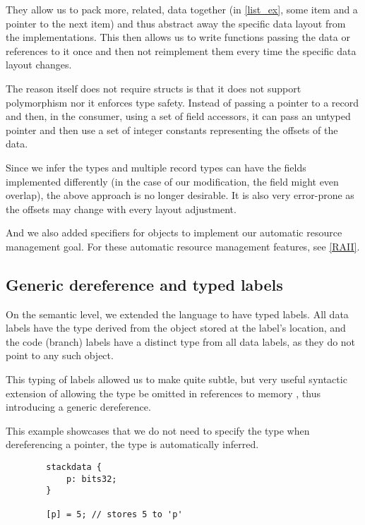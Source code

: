 They allow us to pack more, related, data together (in \cref{list_ex}, some item and a pointer to the next item) and thus abstract away the specific data layout from the implementations. This then allows us to write functions passing the data or references to it once and then not reimplement them every time the specific data layout changes.

The reason \cmm{} itself does not require structs is that it does not support polymorphism nor it enforces type safety. Instead of passing a pointer to a record and then, in the consumer, using a set of field accessors, it can pass an untyped pointer and then use a set of integer constants representing the offsets of the data.

Since we infer the types and multiple record types can have the fields implemented differently (in the case of our modification, the field might even overlap), the above approach is no longer desirable. It is also very error-prone as the offsets may change with every layout adjustment.

And we also added  specifiers for  objects to implement our automatic resource management goal. For these automatic resource management features, see \cref{RAII}.

\subsection{Generic dereference and typed labels}

On the semantic level, we extended the language to have typed labels. All data labels have the type derived from the object stored at the label's location, and the code (branch) labels have a distinct type from all data labels, as they do not point to any such object.

This typing of labels allowed us to make quite subtle, but very useful syntactic extension of allowing the type be omitted in references to memory \cite{ramsey2005c}, thus introducing a generic dereference.

\begin{ex}
    This example showcases that we do not need to specify the type when dereferencing a pointer, the type is automatically inferred.

    \begin{lstlisting}
        stackdata {
            p: bits32;
        }

        [p] = 5; // stores 5 to 'p'
    \end{lstlisting}
\end{ex}

